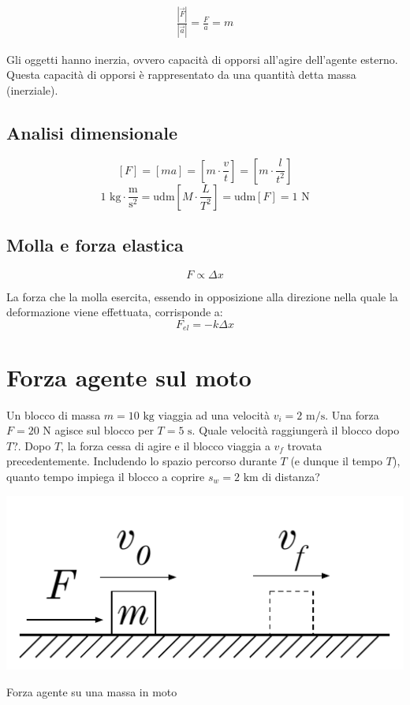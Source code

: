 \vspace{8pt}
\begin{tcolorbox}[colback = red!30, colframe = red!30!black, title = {Seconda legge della dinamica}]
    \begin{align}
        \frac{|\overrightarrow{F}|}{|\overrightarrow{a}|} = \frac{F}{a} = m
    \end{align}
\end{tcolorbox}
\vspace{5pt}


Gli oggetti hanno inerzia, ovvero capacità di opporsi all'agire dell'agente
esterno. Questa capacità di opporsi è rappresentato da una quantità detta
massa (inerziale).

\subsection{Analisi dimensionale}
\[ [F] = [ma] = \left[m\cdot\frac{v}{t}\right] = \left[m\cdot\frac{l}{t^2}\right]  \]
\[ 1\text{ kg}\cdot\frac{\text{m}}{\text{s}^2} = \text{udm}\left[M\cdot\frac{L}{T^2}\right] = \text{udm}[F] = 1\text{ N} \]


\subsection{Molla e forza elastica}
\[ F \propto \Delta x \]

La forza che la molla esercita, essendo in opposizione alla direzione nella
quale la deformazione viene effettuata, corrisponde a:
\[ F_\textit{el} = -k\Delta x \]

\section{Forza agente sul moto}
Un blocco di massa $m = 10 \text{ kg}$ viaggia ad una velocità $v_i =
2 \text{ m/s}$. Una forza $F = 20 \text{ N}$ agisce sul blocco per
$T = 5 \text{ s}$. Quale velocità raggiungerà il blocco dopo $T$?.
Dopo $T$, la forza cessa di agire e il blocco viaggia a $v_f$ trovata
precedentemente. Includendo lo spazio percorso durante $T$ (e dunque il
tempo $T$), quanto tempo impiega il blocco a coprire $s_w = 2\text{ km}$
di distanza?

\begin{marginfigure}
    \centering
    \includegraphics[width = \marginparwidth]{figures/scivola.pdf}
    \caption{Forza agente su una massa in moto}
\end{marginfigure}

